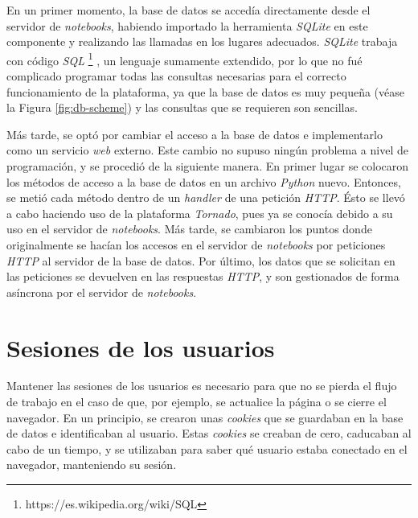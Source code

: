 \documentclass[11pt,spanish,listoffigures]{tfgetsinf}
\begin{document}
En un primer momento, la base de datos se accedía directamente desde el servidor de \textit{notebooks}, habiendo importado la herramienta \textit{SQLite} en este componente y realizando las llamadas en los lugares adecuados. \textit{SQLite} trabaja con código \textit{SQL} \footnote{https://es.wikipedia.org/wiki/SQL} , un lenguaje sumamente extendido,  por lo que no fué complicado programar todas las consultas necesarias para el correcto funcionamiento de la plataforma, ya que la base de datos es muy pequeña (véase la Figura \ref{fig:db-scheme}) y las consultas que se requieren son sencillas.

Más tarde, se optó por cambiar el acceso a la base de datos e implementarlo como un servicio \textit{web} externo. Este cambio no supuso ningún problema a nivel de programación, y se procedió de la siguiente manera. En primer lugar se colocaron los métodos de acceso a la base de datos en un archivo \textit{Python} nuevo. Entonces, se metió cada método dentro de un \textit{handler} de una petición \textit{HTTP}. Ésto se llevó a cabo haciendo uso de la plataforma \textit{Tornado}, pues ya se conocía debido a su uso en el servidor de \textit{notebooks}. Más tarde, se cambiaron los puntos donde originalmente se hacían los accesos en el servidor de \textit{notebooks} por peticiones \textit{HTTP} al servidor de la base de datos. Por último, los datos que se solicitan en las peticiones se devuelven en las respuestas \textit{HTTP}, y son gestionados de forma asíncrona por el servidor de \textit{notebooks}.



\section{Sesiones de los usuarios}
\label{sec:desarrollo-sesiones}

Mantener las sesiones de los usuarios es necesario para que no se pierda el flujo de trabajo en el caso de que, por ejemplo, se actualice la página o se cierre el navegador. En un principio, se crearon unas \textit{cookies} que se guardaban en la base de datos e identificaban al usuario. Estas \textit{cookies} se creaban de cero,  caducaban al cabo de un tiempo, y se utilizaban para saber qué usuario estaba conectado en el navegador, manteniendo su sesión. 
\end{document}
